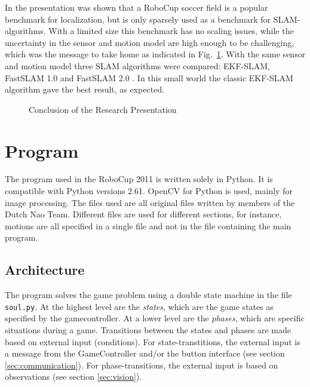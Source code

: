 \documentclass[11pt,a4paper,oneside]{article}
\begin{document}
In the presentation was shown that a RoboCup soccer field is a popular benchmark for localization, but is only sparsely used as a benchmark for SLAM-algorithms. 
With a limited size this benchmark has no scaling issues, while the uncertainty in the sensor and motion model are high enough to be challenging, which was the message to take home as indicated in Fig.~\ref{fig:ConclusionPresentation}. With the same sensor and  motion model three SLAM algorithms were compared: EKF-SLAM, FastSLAM 1.0 and FastSLAM 2.0 \cite{Thrun2005}. In this small world the classic EKF-SLAM algorithm gave the best result, as expected.

\begin{figure}[htb]    	
\centering
{}
\caption{Conclusion of the Research Presentation}
\label{fig:ConclusionPresentation}
\end{figure}
\newpage
\section{Program}
The program used in the RoboCup 2011 is written solely in Python. It is compatible with Python versions 2.61. OpenCV for Python is used, mainly for image processing. The files used are all original files written by members of the Dutch Nao Team. Different files are used for different sections, for instance, motions are all specified in a single file and not in the file containing the main program.
\subsection{Architecture}
\label{sec:architecture}
The program solves the game problem using a double state machine in the file \texttt{soul.py}. At the highest level are the \textit{states}, which are the game states as specified by the gamecontroller. 
At a lower level are the \textit{phases}, which are specific situations during a game. Transitions between the states and phases are made based on external input (conditions). 
For state-transtitions, the external input is a message from the GameController and/or the button interface (see section \ref{sec:communication}). 
For phase-transitions, the external input is based on observations (see section \ref{sec:vision}). 
\end{document}
